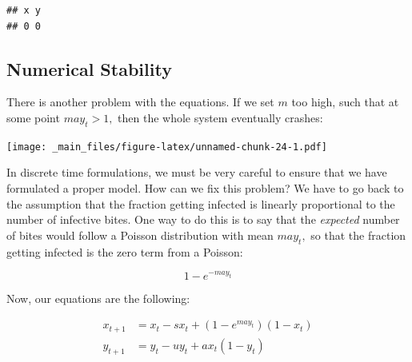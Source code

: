 \documentclass[
]{book}
\newenvironment{Shaded}{\begin{snugshade}}{\end{snugshade}}
\newcommand{\AttributeTok}[1]{\textcolor[rgb]{0.13,0.29,0.53}{#1}}
\newcommand{\DecValTok}[1]{\textcolor[rgb]{0.00,0.00,0.81}{#1}}
\newcommand{\FunctionTok}[1]{\textcolor[rgb]{0.13,0.29,0.53}{\textbf{#1}}}
\newcommand{\NormalTok}[1]{#1}
\newcommand{\OtherTok}[1]{\textcolor[rgb]{0.56,0.35,0.01}{#1}}
\newcommand{\SpecialCharTok}[1]{\textcolor[rgb]{0.81,0.36,0.00}{\textbf{#1}}}
\begin{document}
\begin{Shaded}
\end{Shaded}

\begin{verbatim}
## x y 
## 0 0
\end{verbatim}

\subsection{Numerical Stability}\label{numerical-stability}

There is another problem with the equations. If we set \(m\) too high, such that at some point \(m a y_t > 1,\) then the whole system eventually crashes:

\begin{Shaded}
\end{Shaded}

\texttt{[image: \_main\_files/figure-latex/unnamed-chunk-24-1.pdf]}

In discrete time formulations, we must be very careful to ensure that we have formulated a proper model. How can we fix this problem? We have to go back to the assumption that the fraction getting infected is linearly proportional to the number of infective bites. One way to do this is to say that the \emph{expected} number of bites would follow a Poisson distribution with mean \(may_t,\) so that the fraction getting infected is the zero term from a Poisson:

\[1 - e^{-m a y_t}\]

Now, our equations are the following:

\[\begin{array}{rl}
x_{t+1} &=  x_t - s x_t + (1-e^{m a y_t}) (1-x_t)  \\ 
y_{t+1} &=  y_t - u y_t + a x_t (1 - y_t) \\ 
\end{array}\]
\end{document}
